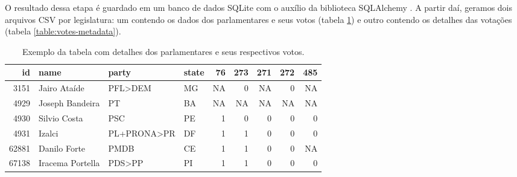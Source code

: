 \documentclass[a4paper,titlepage]{ppgi}\usepackage[]{graphicx}\usepackage[]{color}
\newenvironment{knitrout}{}{} %
\begin{document}
O resultado dessa etapa é guardado em um banco de dados SQLite com o auxílio da
biblioteca SQLAlchemy
\cite{SQLite3,SQLAlchemy}. A partir daí, geramos dois arquivos \gls{CSV} por
legislatura: um contendo os dados dos parlamentares e seus votos (tabela
\ref{table:votes}) e outro contendo os detalhes das votações (tabela
\ref{table:votes-metadata}).

\begin{table}
\centering
\begin{knitrout}
\color{fgcolor}
\begin{tabular}{r|l|l|l|r|r|r|r|r}
\hline
id & name & party & state & 76 & 273 & 271 & 272 & 485\\
\hline
3151 & Jairo Ataíde & PFL>DEM & MG & NA & 0 & NA & 0 & NA\\
\hline
4929 & Joseph Bandeira & PT & BA & NA & NA & NA & NA & NA\\
\hline
4930 & Silvio Costa & PSC & PE & 1 & 0 & 0 & 0 & 0\\
\hline
4931 & Izalci & PL+PRONA>PR & DF & 1 & 1 & 0 & 0 & 0\\
\hline
62881 & Danilo Forte & PMDB & CE & 1 & 1 & 0 & 0 & NA\\
\hline
67138 & Iracema Portella & PDS>PP & PI & 1 & 1 & 0 & 0 & 0\\
\hline
\end{tabular}


\end{knitrout}
\caption{Exemplo da tabela com detalhes dos parlamentares e seus respectivos votos.}
\label{table:votes}
\end{table}
\end{document}
